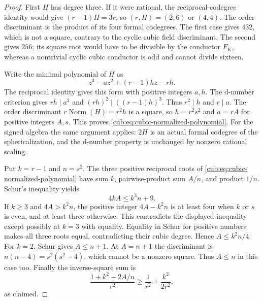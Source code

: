 \begin{proof}
First $H$ has degree three. If it were rational, the reciprocal-codegree
identity would give $(r-1)H=3r$, so $(r,H)=(2,6)$ or $(4,4)$.
The order discriminant is the product of its four formal codegrees.
The first case gives $432$, which is not a square, contrary to the
cyclic cubic field discriminant. The second gives $256$; its square
root would have to be divisible by the conductor $F_K$, whereas a
nontrivial cyclic cubic conductor is odd and cannot divide sixteen.

Write the minimal polynomial of $H$ as
\[
 z^3-a z^2+(r-1)h z-rh.
\]
The reciprocal identity gives this form with positive integers $a,h$.
The d-number criterion gives $rh\mid a^3$ and
$(rh)^2\mid((r-1)h)^3$. Thus $r^2\mid h$ and $r\mid a$.
The order discriminant $r\operatorname{Norm}(H)=r^2h$ is a square,
so $h=r^2s^2$ and $a=rA$ for positive integers $A,s$. This proves
\eqref{cub:eq:cubic-normalized-polynomial}. For the signed algebra the
same argument applies: $2H$ is an actual formal codegree of the
sphericalization, and the d-number property is unchanged by nonzero
rational scaling.

Put $k=r-1$ and $n=s^2$. The three positive reciprocal roots of
\eqref{cub:eq:cubic-normalized-polynomial} have sum $k$, pairwise-product
sum $A/n$, and product $1/n$. Schur's inequality yields
\[
 4kA\le k^3n+9.
\]
If $k\ge3$ and $4A>k^2n$, the positive integer $4A-k^2n$ is at least
four when $k$ or $s$ is even, and at least three otherwise. This
contradicts the displayed inequality except possibly at $k=3$ with
equality. Equality in Schur for positive numbers makes all three roots
equal, contradicting their cubic degree. Hence $A\le k^2n/4$.
For $k=2$, Schur gives $A\le n+1$. At $A=n+1$ the discriminant is
$n(n-4)=s^2(s^2-4)$, which cannot be a nonzero square. Thus $A\le n$
in this case too. Finally the inverse-square sum is
\[
 \frac{1+k^2-2A/n}{r^2}
 \ge\frac1{r^2}+\frac{k^2}{2r^2},
\]
as claimed.
\end{proof}

